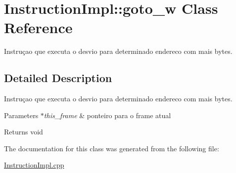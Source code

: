 \hypertarget{class_instruction_impl_1_1goto__w}{}\section{Instruction\+Impl\+:\+:goto\+\_\+w Class Reference}
\label{class_instruction_impl_1_1goto__w}


Instruçao que executa o desvio para determinado endereco com mais bytes.  




\subsection{Detailed Description}
Instruçao que executa o desvio para determinado endereco com mais bytes. 


\begin{DoxyParams}{Parameters}
{\em $\ast$this\+\_\+frame} & ponteiro para o frame atual \\
\hline
\end{DoxyParams}
\begin{DoxyReturn}{Returns}
void 
\end{DoxyReturn}


The documentation for this class was generated from the following file\+:\begin{DoxyCompactItemize}
\item 
\hyperlink{_instruction_impl_8cpp}{Instruction\+Impl.\+cpp}\end{DoxyCompactItemize}
